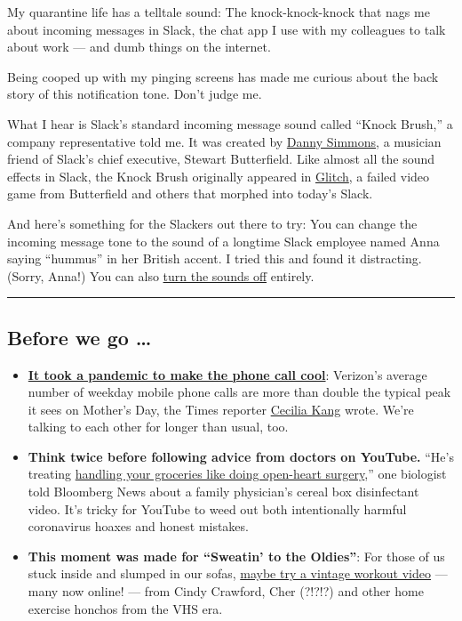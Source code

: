 My quarantine life has a telltale sound: The knock-knock-knock that nags
me about incoming messages in Slack, the chat app I use with my
colleagues to talk about work --- and dumb things on the internet.

Being cooped up with my pinging screens has made me curious about the
back story of this notification tone. Don't judge me.

What I hear is Slack's standard incoming message sound called ``Knock
Brush,'' a company representative told me. It was created by
\href{http://danielsimmons.ca/}{Danny Simmons}, a musician friend of
Slack's chief executive, Stewart Butterfield. Like almost all the sound
effects in Slack, the Knock Brush originally appeared in
\href{https://www.glitchthegame.com/}{Glitch}, a failed video game from
Butterfield and others that morphed into today's Slack.

And here's something for the Slackers out there to try: You can change
the incoming message tone to the sound of a longtime Slack employee
named Anna saying ``hummus'' in her British accent. I tried this and
found it distracting. (Sorry, Anna!) You can also
\href{https://slack.com/help/articles/360001559367-Troubleshoot-Slack-notifications\#h_60215489841550189674699}{turn
the sounds off} entirely.

\begin{center}\rule{0.5\linewidth}{\linethickness}\end{center}

\hypertarget{before-we-go-}{%
\subsection{Before we go \ldots{}}\label{before-we-go-}}

\begin{itemize}
\item
  \textbf{\href{https://www.nytimes3xbfgragh.onion/2020/04/09/technology/phone-calls-voice-virus.html}{It
  took a pandemic to make the phone call cool}}: Verizon's average
  number of weekday mobile phone calls are more than double the typical
  peak it sees on Mother's Day, the Times reporter
  \href{https://www.nytimes3xbfgragh.onion/by/cecilia-kang}{Cecilia
  Kang} wrote. We're talking to each other for longer than usual, too.
\item
  \textbf{Think twice before following advice from doctors on YouTube.}
  ``He's treating
  \href{https://www.bloomberg.com/news/articles/2020-04-08/youtube-tested-by-flood-of-star-doctors-during-infodemic}{handling
  your groceries like doing open-heart surgery},'' one biologist told
  Bloomberg News about a family physician's cereal box disinfectant
  video. It's tricky for YouTube to weed out both intentionally harmful
  coronavirus hoaxes and honest mistakes.
\item
  \textbf{This moment was made for ``Sweatin' to the Oldies''}: For
  those of us stuck inside and slumped in our sofas,
  \href{https://www.nytimes3xbfgragh.onion/2020/04/09/style/self-care/what-are-the-best-workout-videos.html}{maybe
  try a vintage workout video} --- many now online! --- from Cindy
  Crawford, Cher (?!?!?) and other home exercise honchos from the VHS
  era.
\end{itemize}

